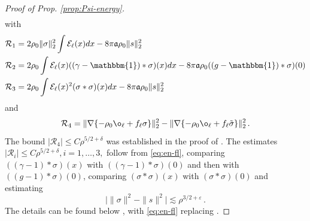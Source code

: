 \documentclass[a4paper,11pt]{article}
\def\cE{\mathcal{E}}
\def\cR{\mathcal{R}}
\def\eps{\varepsilon}
\def\ph{\varphi}
\numberwithin{equation}{section}
\let\s=\sigma \let\t=\tau     \let\f=\phi    \let\ph=\varphi   \let\c=\chi
\def\aa{\mathfrak{a}}
\begin{document}
\begin{proof}[Proof of Prop. \ref{prop:Psi-energy}]
\begin{equation}
\begin{split}
\end{split}
\end{equation} 
with 
\[\begin{split}
\mathcal{R}_1 =\; &  2\rho_0 \|\s\|_2^2  \int \cE_\ell(x) dx  - 8 \pi \aa \rho_0 \| s\|_2^2 \\
\mathcal{R}_2 = \; & 2\rho_0 \int  \cE_\ell(x) ((\gamma-\mathbbm{1}) \ast \sigma)(x) dx - 8 \pi \aa \rho_0   ((g-\mathbbm{1}) \ast \sigma)(0) \\
\mathcal{R}_3 = \; & 2\rho_0 \int \cE_\ell(x)^2 (\sigma \ast \sigma)(x) dx - 8 \pi \aa \rho_0 \| s\|_2^2
\end{split}\]
and
\[
\mathcal{R}_4 =  \| \nabla \{- \rho_0 \o_\ell +f_\ell \s\}\|_2^2 - \| \nabla \{- \rho_0 \o_\ell +f_\ell \tilde\s\}\|_2^2\,.
\]
The bound $|\cR_4| \le C \rho^{5/2+\delta}$ was established in the proof of \cite[Lemma 3.1]{BBCOS}. The estimates $|\cR_i| \le C \rho^{5/2+\delta}, i=1,\ldots,3,$ follow from \eqref{eq:en-fl}, comparing $((\gamma-1) * \sigma) (x)$ with $((\gamma-1) * \sigma) (0)$ and then with $((g-1) * \sigma) (0)$, comparing $(\sigma * \sigma) (x)$ with $(\sigma * \sigma) (0)$ and  estimating 
\begin{equation}\label{eq:sigma-s}
\big| \| \sigma \|^2 - \| s \|^2 \big| \lesssim \rho^{3/2+\eps} \,.
\end{equation} 
The details can be found below \cite[Eq.~(3.6)]{BBCOS}, with  \eqref{eq:en-fl} replacing \cite[Eq.~(2.6)]{BBCOS}. 


\end{proof}
\end{document}
